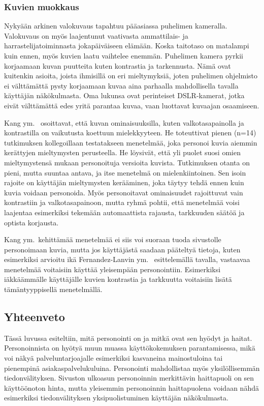 \documentclass[finnish, 12pt, a4paper, elec, utf8, a-1b, online]{aaltothesis}
\begin{document}
\subsubsection{Kuvien muokkaus}\label{images-personalization}

Nykyään arkinen valokuvaus tapahtuu pääasiassa puhelimen kameralla. Valokuvaus
on myös laajentunut vaativasta ammattilais- ja harrastelijatoiminnasta
jokapäiväiseen elämään. Koska taitotaso on matalampi kuin ennen, myös kuvien
laatu vaihtelee enemmän. Puhelimen kamera pyrkii korjaamaan kuvan puutteita
kuten kontrastia ja tarkennusta. Nämä ovat kuitenkin asioita, joista ihmisillä
on eri mieltymyksiä, joten puhelimen ohjelmisto ei välttämättä pysty korjaamaan
kuvaa aina parhaalla mahdollisella tavalla käyttäjän näkökulmasta. Oma lukunsa
ovat perinteiset DSLR-kamerat, jotka eivät välttämättä edes yritä parantaa
kuvaa, vaan luottavat kuvaajan osaamiseen.

Kang ym.~\cite{5539850} osoittavat, että kuvan ominaisuuksilla, kuten
valkotasapainolla ja kontrastilla on vaikutusta koettuun mielekkyyteen. He
toteuttivat pienen (n=14) tutkimuksen kollegoillaan testatakseen menetelmää,
joka personoi kuvia aiemmin kerättyjen mieltymysten perusteella. He löysivät,
että yli puolet suosi omien mieltymystensä mukaan personoituja versioita
kuvista. Tutkimuksen otanta on pieni, mutta suuntaa antava, ja itse menetelmä on
mielenkiintoinen. Sen isoin rajoite on käyttäjän mieltymysten kerääminen, joka
täytyy tehdä ennen kuin kuvia voidaan personoida. Myös personoitavat
ominaisuudet rajoittuvat vain kontrastiin ja valkotasapainoon, mutta ryhmä
pohtii, että menetelmää voisi laajentaa esimerkiksi tekemään automaattista
rajausta, tarkkuuden säätöä ja optista korjausta.

Kang ym.~kehittämää menetelmää ei siis voi suoraan tuoda sivustolle
personoimaan kuvia, mutta jos käyttäjästä saadaan pääteltyä tietoja, kuten
esimerkiksi arvioitu ikä Fernandez-Lanvin ym.~\cite{fernandez2018dimension}
esittelemällä tavalla, vastaavaa menetelmää voitaisiin käyttää yleisempään
personointiin. Esimerkiksi iäkkäämmälle käyttäjälle kuvien kontrastia ja
tarkkuutta voitaisiin lisätä tämäntyyppisellä menetelmällä.

\subsection{Yhteenveto}

Tässä luvussa esiteltiin, mitä personointi on ja mitkä ovat sen hyödyt ja
haitat. Personoinnista on hyötyä muun muassa käyttökokemuksen parantamisessa,
mikä voi näkyä palveluntarjoajalle esimerkiksi kasvaneina mainostuloina tai
pienempinä asiakaspalvelukuluina. Personointi mahdollistaa myös yksilöllisemmän
tiedonvälityksen. Sivuston ulkoasun personoinnin merkittävin haittapuoli on sen
käyttöönoton hinta, mutta yleisemmin personoinnin haittapuolena voidaan nähdä
esimerkiksi tiedonvälityksen yksipuolistuminen käyttäjän näkökulmasta.
\end{document}
